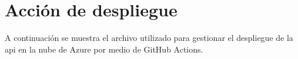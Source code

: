 \chapter{Acción de despliegue}
\label{ch:accion_despliegue}

A continuación se muestra el archivo utilizado para gestionar el despliegue de la \acrshort{api} en la nube de Azure por medio de GitHub Actions.

